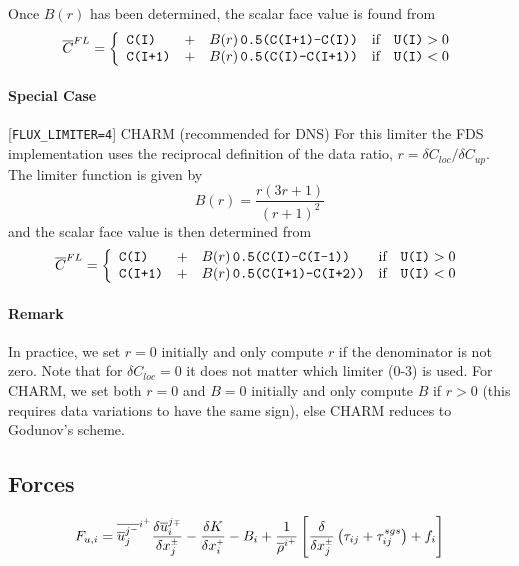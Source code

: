 \documentclass[11pt]{article}
\begin{document}
Once $B(r)$ has been determined, the scalar face value is found from
\begin{equation}
\label{eqn_flux_limiter}
\overline{C}^{\tiny FL} = \left\{ \begin{array}{lcll} \mbox{\tt C(I)} &+& B(r) \,\mbox{\tt 0.5(C(I+1)-C(I))} & \mbox{if} \quad \mbox{\tt U(I)}>0 \\
\mbox{\tt C(I+1)} &+& B(r) \,\mbox{\tt 0.5(C(I)-C(I+1))} & \mbox{if} \quad \mbox{\tt U(I)}<0 \end{array} \right.
\end{equation}

\paragraph{Special Case} [{\tt FLUX\_LIMITER=4}] CHARM (recommended for DNS) For this limiter the FDS implementation uses the reciprocal definition of the data ratio, $r = \delta C_{loc}/\delta C_{up}$.  The limiter function is given by \cite{Zhou,Kempf}
\begin{equation}
B(r) = \frac{r(3r+1)}{(r+1)^2}
\end{equation}
and the scalar face value is then determined from
\begin{equation}
\label{eqn_charm_limiter}
\overline{C}^{\tiny FL} = \left\{ \begin{array}{lcll} \mbox{\tt C(I)} &+& B(r) \,\mbox{\tt 0.5(C(I)-C(I-1))} & \mbox{if} \quad \mbox{\tt U(I)}>0 \\
\mbox{\tt C(I+1)} &+& B(r) \,\mbox{\tt 0.5(C(I+1)-C(I+2))} & \mbox{if} \quad \mbox{\tt U(I)}<0 \end{array} \right.
\end{equation}

\paragraph{Remark} In practice, we set $r=0$ initially and only compute $r$ if the denominator is not zero.  Note that for $\delta C_{loc}=0$ it does not matter which limiter (0-3) is used.  For CHARM, we set both $r=0$ and $B=0$ initially and only compute $B$ if $r>0$ (this requires data variations to have the same sign), else CHARM reduces to Godunov's scheme.

\subsection{Forces}

\begin{equation}
\label{eqn_force}
F_{u,i} = \overline{\overline{u}_j^{j^-}}^{i^+} \frac{\delta \overline{u}_i^{j{\scriptscriptstyle \mp}}}{\delta x_j^{\scriptscriptstyle \pm}} - \frac{\delta K}{\delta x_i^{\scriptscriptstyle +}} - B_i + \frac{1}{\overline{\rho}^{i^+}} \left[ \frac{\delta}{\delta x_j^{\scriptscriptstyle \pm}} \left( \tau_{ij} + \tau_{ij}^{sgs} \right) + f_i \right]
\end{equation}
\end{document}
